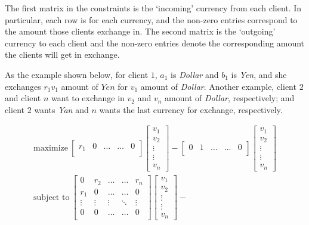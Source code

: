 \documentclass[12pt]{article}
\begin{document}
The first matrix in the constraints is the `incoming' currency from each client. In particular, each row is for each currency, and the non-zero entries correspond to the amount those clients exchange in. The second matrix is the `outgoing' currency to each client and the non-zero entries denote the corresponding amount the clients will get in exchange. 

As the example shown below, for client $1$, $a_1$ is \emph{Dollar} and $b_1$ is \emph{Yen}, and she exchanges $r_1 v_1$ amount of $Yen$ for $v_1$ amount of \emph{Dollar}. Another example, client $2$ and client $n$ want to exchange in $v_2$ and $v_n$ amount of \emph{Dollar}, respectively; and client $2$ wants \emph{Yan} and $n$ wants the last currency for exchange, respectively. 
 
\begin{align*}
\text{maximize} ~ 
\begin{bmatrix}
r_1 & 0 & \dots & \dots & 0 \\
\end{bmatrix}
\begin{bmatrix}
v_1\\
v_2\\
\vdots\\
\vdots\\
v_n
\end{bmatrix} - 
\begin{bmatrix}
0 & 1 & \dots & \dots & 0 \\
\end{bmatrix}
\begin{bmatrix}
v_1\\
v_2\\
\vdots\\
\vdots\\
v_n
\end{bmatrix}\\ 
\text{subject to} ~
\begin{bmatrix}
	0 & r_2 & \dots & \dots & r_n \\
	r_1 & 0 & \dots & \dots & 0 \\
	\vdots & \vdots & \vdots & \ddots & \vdots \\
	0 & 0 & \dots & \dots & 0 \\
\end{bmatrix}
\begin{bmatrix}
v_1\\
v_2\\
\vdots\\
\vdots\\
v_n
\end{bmatrix} - 

\end{align*}
\end{document}
